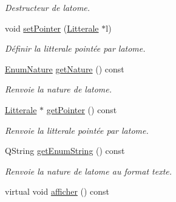 \begin{DoxyCompactItemize}
\begin{DoxyCompactList}\small\item\em Destructeur de l\textquotesingle{}atome. \end{DoxyCompactList}\item 
void \hyperlink{class_l_t_atome_acede21b7dde27b0973b3a9de0db6ad40}{set\+Pointer} (\hyperlink{class_litterale}{Litterale} $\ast$l)
\begin{DoxyCompactList}\small\item\em Définir la litterale pointée par l\textquotesingle{}atome. \end{DoxyCompactList}\item 
\hyperlink{class_l_t_atome_a340480fc682a6d8fd819026d20278b49}{Enum\+Nature} \hyperlink{class_l_t_atome_af0794b76e812f3918b47fedd95e06eae}{get\+Nature} () const 
\begin{DoxyCompactList}\small\item\em Renvoie la nature de l\textquotesingle{}atome. \end{DoxyCompactList}\item 
\hyperlink{class_litterale}{Litterale} $\ast$ \hyperlink{class_l_t_atome_a495b6dbfaa0e2ebd997f969fbaa2015e}{get\+Pointer} () const 
\begin{DoxyCompactList}\small\item\em Renvoie la litterale pointée par l\textquotesingle{}atome. \end{DoxyCompactList}\item 
Q\+String \hyperlink{class_l_t_atome_ae6acabae4ebfbaa0d36e184b63647b63}{get\+Enum\+String} () const 
\begin{DoxyCompactList}\small\item\em Renvoie la nature de l\textquotesingle{}atome au format texte. \end{DoxyCompactList}\item 
virtual void \hyperlink{class_l_t_atome_a4ab2828d23dc388e567522485bdebfe6}{afficher} () const \hypertarget{class_l_t_atome_a4ab2828d23dc388e567522485bdebfe6}{}\label{class_l_t_atome_a4ab2828d23dc388e567522485bdebfe6}


\end{DoxyCompactItemize}

